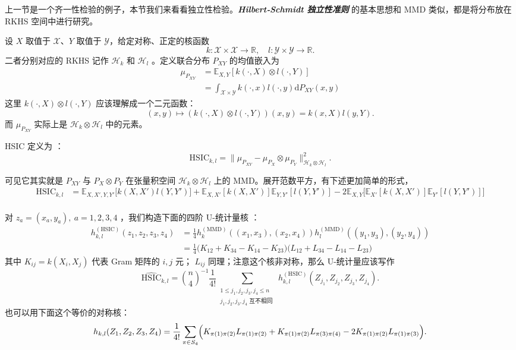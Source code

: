 上一节是一个齐一性检验的例子，本节我们来看看独立性检验。\textbf{\emph{Hilbert‑Schmidt 独立性准则}} 的基本思想和 MMD 类似，都是将分布放在 RKHS 空间中进行研究。

\begin{example}\label{ex:ch10:hsic}
设 $X$ 取值于 $\mathscr X$、$Y$ 取值于 $\mathscr Y$，给定对称、正定的核函数
\[
k:\mathscr X\times \mathscr X\to \mathbb R,\quad l:\mathscr Y\times \mathscr Y\to \mathbb R.
\]
二者分别对应的 RKHS 记作 $\mathscr H_k$ 和 $\mathscr H_l$ 。定义联合分布 $P_{XY}$ 的均值嵌入为
\[\begin{aligned} \mu_{P_{XY}}&=\mathbb{E}_{X,Y}[k(\cdot,X)\otimes l(\cdot,Y)]\\ &=\int_{\mathscr X\times\mathscr Y}k(\cdot ,x)l(\cdot,y)\mathrm dP_{XY}(x,y) \end{aligned}\]
这里 $k(\cdot,X)\otimes l(\cdot,Y)$ 应该理解成一个二元函数：
\[
(x,y)\mapsto (k(\cdot,X)\otimes l(\cdot,Y))(x,y)=k(x,X)l(y,Y).
\]
而 $\mu_{P_{XY}}$ 实际上是 $\mathscr H_k\otimes \mathscr H_l$ 中的元素。

HSIC 定义为 \cite{gretton2005,gretton2008}：
\[
\mathrm{HSIC}_{k,l} = \|\mu_{P_{XY}} - \mu_{P_X} \otimes \mu_{P_Y}\|_{\mathscr{H}_k\otimes\mathscr{H}_l}^2.
\]

可见它其实就是 $P_{XY}$ 与 $P_X\otimes P_Y$ 在张量积空间 $\mathscr H_k\otimes \mathscr H_l$ 上的 MMD。展开范数平方，有下述更加简单的形式，
\[\begin{aligned} \mathrm{HSIC}_{k,l} &= \mathbb{E}_{X,X',Y,Y'}\bigl[k(X,X')l(Y,Y')\bigr] + \mathbb{E}_{X,X'}[k(X,X')]\mathbb{E}_{Y,Y'}[l(Y,Y')] - 2\mathbb{E}_{X,Y}\bigl[\mathbb{E}_{X'}[k(X,X')]\mathbb{E}_{Y'}[l(Y,Y')]\bigr]\\  \end{aligned}\]

对 $z_a = (x_a, y_a),\ a=1,2,3,4$ ，我们构造下面的四阶 U-统计量核 ：
\[\begin{aligned}h_{k,l}^{(\mathrm{HSIC})}(z_1, z_2, z_3, z_4) & = \frac{1}{4} h_k^{(\mathrm{MMD})}((x_1,x_3),(x_2,x_4)) h_l^{(\mathrm{MMD})}((y_1,y_3),(y_2,y_4))\\ &=\frac{1}{4} \Big(K_{12} + K_{34} - K_{14} - K_{23}\Big)\Big(L_{12} + L_{34} - L_{14} - L_{23}\Big)  \end{aligned}\]
其中 $K_{ij}=k(X_i,X_j)$ 代表 Gram 矩阵的 $i,j$ 元； $L_{ij}$ 同理；注意这个核非对称，那么 U-统计量应该写作
\[
\widehat{\mathrm{HSIC}}_{k,l}= \binom{n}{4}^{-1} \frac1{4!}\sum_{\substack{1\le j_1 , j_2 , j_3 , j_4 \le n\\ j_1,j_2,j_3,j_4\text{ 互不相同 }}} h_{k,l}^{(\text{HSIC})}(Z_{j_1}, Z_{j_2}, Z_{j_3}, Z_{j_4}).
\]
也可以用下面这个等价的对称核：
\[
h_{k,l}(Z_1,Z_2,Z_3,Z_4) = \frac{1}{4!}\sum_{\pi \in S_4} \Bigl(K_{\pi(1)\pi(2)} L_{\pi(1)\pi(2)} + K_{\pi(1)\pi(2)} L_{\pi(3)\pi(4)} - 2K_{\pi(1)\pi(2)} L_{\pi(1)\pi(3)}\Bigr).
\]


\end{example}
